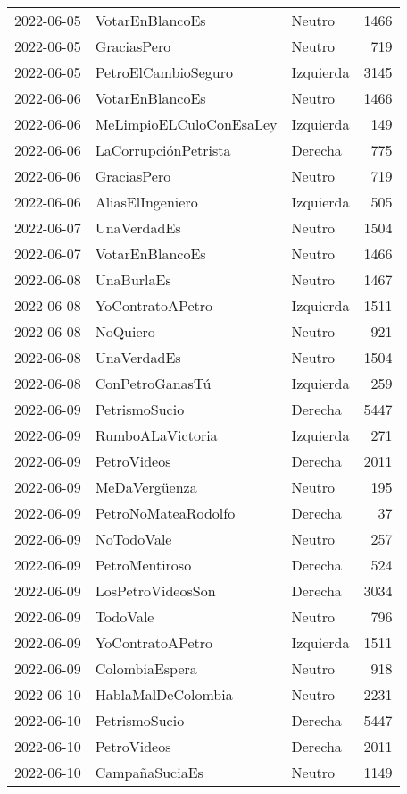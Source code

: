 \begin{longtable}{lllr}
2022-06-05 & VotarEnBlancoEs & Neutro & 1466 \\
2022-06-05 & GraciasPero & Neutro & 719 \\
2022-06-05 & PetroElCambioSeguro & Izquierda & 3145 \\
2022-06-06 & VotarEnBlancoEs & Neutro & 1466 \\
2022-06-06 & MeLimpioELCuloConEsaLey & Izquierda & 149 \\
2022-06-06 & LaCorrupciónPetrista & Derecha & 775 \\
2022-06-06 & GraciasPero & Neutro & 719 \\
2022-06-06 & AliasElIngeniero & Izquierda & 505 \\
2022-06-07 & UnaVerdadEs & Neutro & 1504 \\
2022-06-07 & VotarEnBlancoEs & Neutro & 1466 \\
2022-06-08 & UnaBurlaEs & Neutro & 1467 \\
2022-06-08 & YoContratoAPetro & Izquierda & 1511 \\
2022-06-08 & NoQuiero & Neutro & 921 \\
2022-06-08 & UnaVerdadEs & Neutro & 1504 \\
2022-06-08 & ConPetroGanasTú & Izquierda & 259 \\
2022-06-09 & PetrismoSucio & Derecha & 5447 \\
2022-06-09 & RumboALaVictoria & Izquierda & 271 \\
2022-06-09 & PetroVideos & Derecha & 2011 \\
2022-06-09 & MeDaVergüenza & Neutro & 195 \\
2022-06-09 & PetroNoMateaRodolfo & Derecha & 37 \\
2022-06-09 & NoTodoVale & Neutro & 257 \\
2022-06-09 & PetroMentiroso & Derecha & 524 \\
2022-06-09 & LosPetroVideosSon & Derecha & 3034 \\
2022-06-09 & TodoVale & Neutro & 796 \\
2022-06-09 & YoContratoAPetro & Izquierda & 1511 \\
2022-06-09 & ColombiaEspera & Neutro & 918 \\
2022-06-10 & HablaMalDeColombia & Neutro & 2231 \\
2022-06-10 & PetrismoSucio & Derecha & 5447 \\
2022-06-10 & PetroVideos & Derecha & 2011 \\
2022-06-10 & CampañaSuciaEs & Neutro & 1149 \\

\end{longtable}
